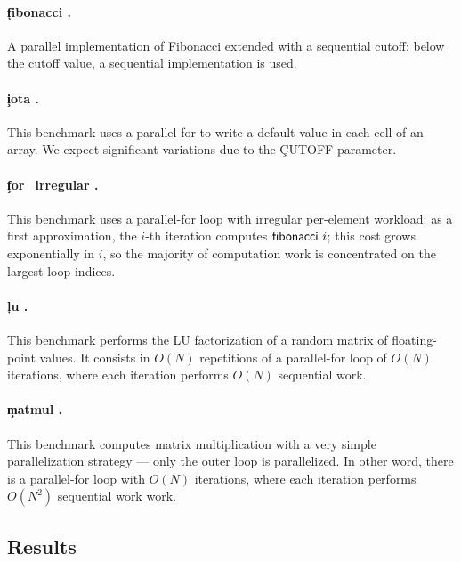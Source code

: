 \paragraph{\c{fibonacci} .}

A parallel implementation of Fibonacci extended with a sequential cutoff: below the cutoff value, a sequential implementation is used.

\paragraph{\c{iota} .}

This benchmark uses a parallel-for to write a default value in each cell of an array.
We expect significant variations due to the \c{CUTOFF} parameter.

\paragraph{\c{for\_irregular} .}

This benchmark uses a parallel-for loop with irregular per-element workload: as a first approximation, the $i$-th iteration computes $\l{fibonacci}\ i$; this cost grows exponentially in $i$, so the majority of computation work is concentrated on the largest loop indices.

\paragraph{\c{lu} .}

This benchmark performs the LU factorization of a random matrix of floating-point values.
It consists in $O(N)$ repetitions of a parallel-for loop of $O(N)$ iterations, where each iteration performs $O(N)$ sequential work.

\paragraph{\c{matmul} .}

This benchmark computes matrix multiplication with a very simple parallelization strategy --- only the outer loop is parallelized.
In other word, there is a parallel-for loop with $O(N)$ iterations, where each iteration performs $O(N^2)$ sequential work work.

\subsection{Results}


